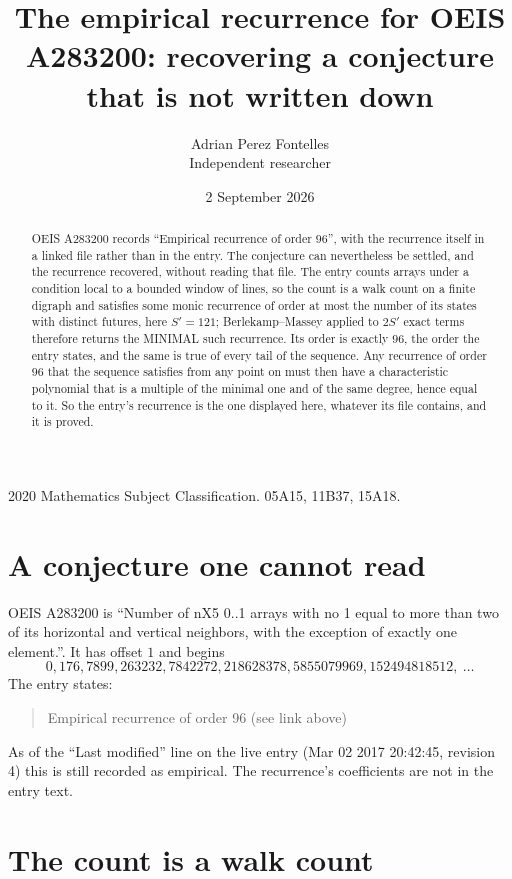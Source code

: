 \documentclass[11pt,a4paper]{article}
\title{The empirical recurrence for OEIS A283200: recovering a conjecture that is not written down}
\author{Adrian Perez Fontelles\\ \small Independent researcher}
\date{2 September 2026}
\theoremstyle{plain}
\theoremstyle{definition}
\begin{document}
\maketitle

\begin{abstract}
OEIS A283200 records ``Empirical recurrence of order $96$'', with the recurrence itself in a
linked file rather than in the entry. The conjecture can nevertheless be settled, and the
recurrence recovered, without reading that file. The entry counts arrays under a condition
local to a bounded window of lines, so the count is a walk count on a finite digraph and
satisfies some monic recurrence of order at most the number of its states with distinct
futures, here $S'=121$; Berlekamp--Massey applied to $2S'$ exact
terms therefore returns the MINIMAL such recurrence. Its order is exactly $96$, the order
the entry states, and the same is true of every tail of the sequence. Any recurrence of order
$96$ that the sequence satisfies from any point on must then have a characteristic
polynomial that is a multiple of the minimal one and of the same degree, hence equal to it. So
the entry's recurrence is the one displayed here, whatever its file contains, and it is
proved.
\end{abstract}

\noindent\small 2020 Mathematics Subject Classification. 05A15, 11B37, 15A18.\normalsize

\section{A conjecture one cannot read}

OEIS A283200 is ``Number of nX5 0..1 arrays with no 1 equal to more than two of its horizontal and vertical neighbors, with the exception of exactly one element.''. It has offset $1$ and begins
\[
0, 176, 7899, 263232, 7842272, 218628378, 5855079969, 152494818512,\ \dots
\]
The entry states:
\begin{quote}
Empirical recurrence of order 96 (see link above)
\end{quote}
As of the ``Last modified'' line on the live entry (Mar 02 2017 20:42:45, revision 4) this is still
recorded as empirical. The recurrence's coefficients are not in the entry text.

\section{The count is a walk count}
\end{document}
